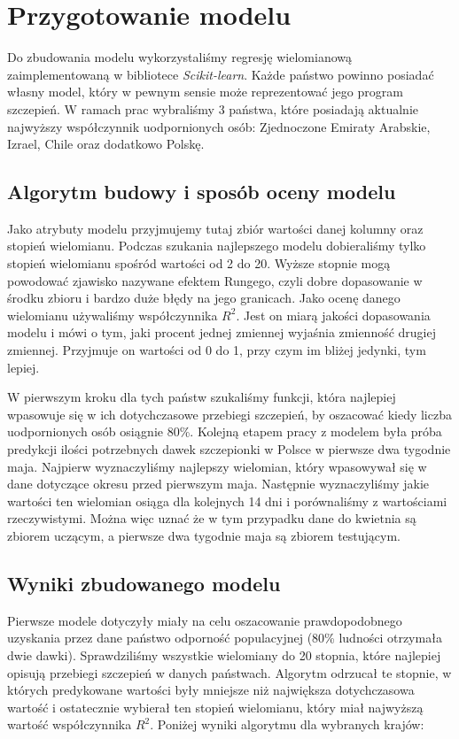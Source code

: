\documentclass[12pt, oneside]{article}
\begin{document}
\section{Przygotowanie modelu} 

Do zbudowania modelu wykorzystaliśmy regresję wielomianową zaimplementowaną w bibliotece \emph{Scikit-learn}. Każde państwo powinno posiadać własny model, który w pewnym sensie może reprezentować jego program szczepień. W ramach prac wybraliśmy 3 państwa, które posiadają aktualnie najwyższy współczynnik uodpornionych osób: Zjednoczone Emiraty Arabskie, Izrael, Chile oraz dodatkowo Polskę. 

\subsection{Algorytm budowy i sposób oceny modelu}

Jako atrybuty modelu przyjmujemy tutaj zbiór wartości danej kolumny oraz stopień wielomianu. Podczas szukania najlepszego modelu dobieraliśmy tylko stopień wielomianu spośród wartości od 2 do 20. Wyższe stopnie mogą powodować zjawisko nazywane efektem Rungego, czyli dobre dopasowanie w środku zbioru i bardzo duże błędy na jego granicach. Jako ocenę danego wielomianu używaliśmy współczynnika $R^{2}$. Jest on miarą jakości dopasowania modelu i mówi o tym, jaki procent jednej zmiennej wyjaśnia zmienność drugiej zmiennej. Przyjmuje on wartości od 0 do 1, przy czym im bliżej jedynki, tym lepiej.

W pierwszym kroku dla tych państw szukaliśmy funkcji, która najlepiej wpasowuje się w ich dotychczasowe przebiegi szczepień, by oszacować kiedy liczba uodpornionych osób osiągnie 80\%. Kolejną etapem pracy z modelem była próba predykcji ilości potrzebnych dawek szczepionki w Polsce w pierwsze dwa tygodnie maja. Najpierw wyznaczyliśmy najlepszy wielomian, który wpasowywał się w dane dotyczące okresu przed pierwszym maja. Następnie wyznaczyliśmy jakie wartości ten wielomian osiąga dla kolejnych 14 dni i porównaliśmy z wartościami rzeczywistymi. Można więc uznać że w tym przypadku dane do kwietnia są zbiorem uczącym, a pierwsze dwa tygodnie maja są zbiorem testującym.   

\subsection{Wyniki zbudowanego modelu}

Pierwsze modele dotyczyły miały na celu oszacowanie prawdopodobnego uzyskania przez dane państwo odporność populacyjnej (80\% ludności otrzymała dwie dawki). Sprawdziliśmy wszystkie wielomiany do 20 stopnia, które najlepiej opisują przebiegi szczepień w danych państwach. Algorytm odrzucał te stopnie, w których predykowane wartości były mniejsze niż największa dotychczasowa wartość i ostatecznie wybierał ten stopień wielomianu, który miał najwyższą wartość współczynnika $R^2$. Poniżej wyniki algorytmu dla wybranych krajów:
\end{document}
